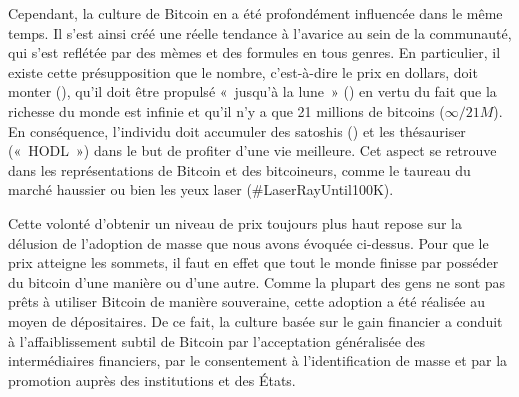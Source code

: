 Cependant, la culture de Bitcoin en a été profondément influencée dans le même temps. Il s'est ainsi créé une réelle tendance à l'avarice au sein de la communauté, qui s'est reflétée par des mèmes et des formules en tous genres. En particulier, il existe cette présupposition que le nombre, c'est-à-dire le prix en dollars, doit monter (), qu'il doit être propulsé «~jusqu'à la lune~» () en vertu du fait que la richesse du monde est infinie et qu'il n'y a que 21 millions de bitcoins ($\infty / 21M$). En conséquence, l'individu doit accumuler des satoshis () et les thésauriser («~HODL~») dans le but de profiter d'une vie meilleure. Cet aspect se retrouve dans les représentations de Bitcoin et des bitcoineurs, comme le taureau du marché haussier ou bien les yeux laser (\#LaserRayUntil100K). %

Cette volonté d'obtenir un niveau de prix toujours plus haut repose sur la délusion de l'adoption de masse que nous avons évoquée ci-dessus. Pour que le prix atteigne les sommets, il faut en effet que tout le monde finisse par posséder du bitcoin d'une manière ou d'une autre. Comme la plupart des gens ne sont pas prêts à utiliser Bitcoin de manière souveraine, cette adoption a été réalisée au moyen de dépositaires. De ce fait, la culture basée sur le gain financier a conduit à l'affaiblissement subtil de Bitcoin par l'acceptation généralisée des intermédiaires financiers, par le consentement à l'identification de masse et par la promotion auprès des institutions et des États. %

